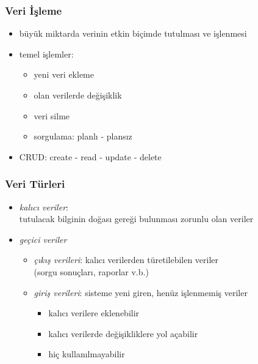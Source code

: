 \documentclass[dvipsnames]{beamer}
\theoremstyle{definition}
\theoremstyle{example}
\theoremstyle{plain}
\begin{document}
\begin{frame}
  \frametitle{Veri İşleme}

  \begin{itemize}
    \item büyük miktarda verinin etkin biçimde tutulması ve işlenmesi

    \pause
    \medskip
    \item temel işlemler:
    \begin{itemize}
      \item yeni veri ekleme
      \item olan verilerde değişiklik
      \item veri silme
      \item sorgulama: planlı - plansız
    \end{itemize}
    \item \alert{CRUD}: create - read - update - delete
  \end{itemize}
\end{frame}

\begin{frame}
  \frametitle{Veri Türleri}

  \begin{itemize}
    \item \emph{kalıcı veriler}:\\
      tutulacak bilginin doğası gereği bulunması zorunlu olan veriler

    \pause
    \bigskip
    \item \emph{geçici veriler}
    \begin{itemize}
      \item \emph{çıkış verileri}: kalıcı verilerden türetilebilen veriler\\
        (sorgu sonuçları, raporlar v.b.)

      \pause
      \medskip
      \item \emph{giriş verileri}: sisteme yeni giren, henüz işlenmemiş veriler
      \begin{itemize}
        \item kalıcı verilere eklenebilir
        \item kalıcı verilerde değişikliklere yol açabilir
        \item hiç kullanılmayabilir
      \end{itemize}
    \end{itemize}
  \end{itemize}
\end{frame}
\end{document}
